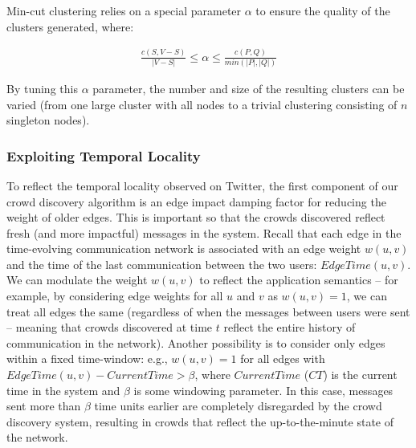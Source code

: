 \documentclass{sig-alternate}
\begin{document}



\medskip
Min-cut clustering relies on a special parameter $\alpha$ to
ensure the quality of the clusters generated, where:

\begin{align}
\label{eq:clustering-quality}
\frac{c(S, V-S)}{|V-S|} \leq \alpha \leq \frac{c(P, Q)}{min(|P|, |Q|)}
\end{align} 

By tuning this $\alpha$ parameter, the number and size of the resulting clusters can be varied (from one large cluster with all nodes to a trivial clustering consisting of $n$ singleton nodes).


\subsubsection{Exploiting Temporal Locality}
To reflect the temporal locality observed on Twitter, the first component of our crowd discovery algorithm is an edge impact damping
factor for reducing the weight of older edges. This is important so that the
crowds discovered reflect fresh (and more impactful) messages in the system.
Recall that each edge in the time-evolving communication network is associated
with an edge weight $w(u, v)$ and the time of the last communication between the
two users: $EdgeTime(u,v)$. We can modulate the weight $w(u, v)$ to reflect the
application semantics -- for example, by considering edge weights for all $u$ and
$v$ as $w(u, v) = 1$, we can treat all edges the same (regardless of when the
messages between users were sent -- meaning that crowds discovered at time $t$ reflect the entire history of communication in the network). Another possibility is to consider only edges
within a fixed time-window: e.g., $w(u, v) = 1$ for all edges with $EdgeTime(u,v)
- CurrentTime > \beta$, where $CurrentTime$ ($CT$) is the current time in the
system and $\beta$ is some windowing parameter. In this case, messages sent more
than $\beta$ time units earlier are completely disregarded by the crowd discovery
system, resulting in crowds that reflect the up-to-the-minute state of the network.
\end{document}
